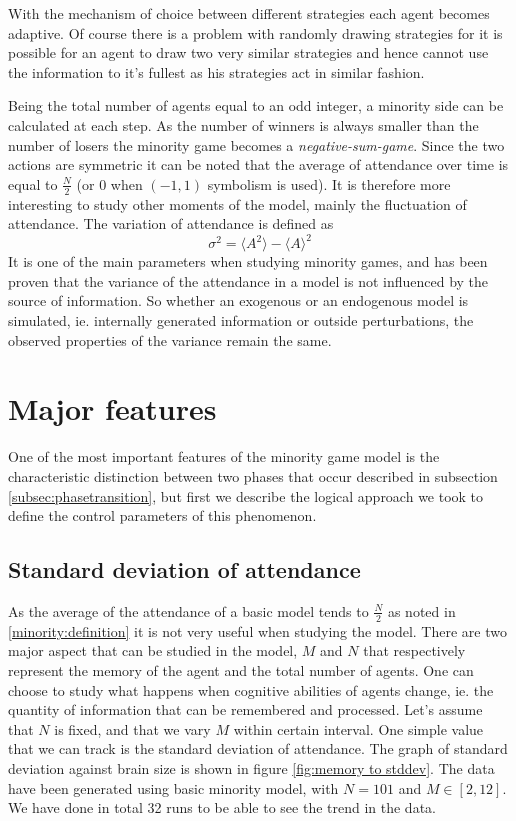 With the mechanism of choice between different strategies each agent becomes adaptive.
Of course there is a problem with randomly drawing strategies for it is possible for an agent to draw two very similar strategies and hence cannot use the information to it's fullest as his strategies act in similar fashion.

Being the total number of agents equal to an odd integer, a minority side can be calculated at each step.
As the number of winners is always smaller than the number of losers the minority game becomes a \textit{negative-sum-game}.
Since the two actions are symmetric it can be noted that the average of attendance over time is equal to $\frac{N}{2}$ (or $0$ when $(-1,1)$ symbolism is used).
It is therefore more interesting to study other moments of the model, mainly the fluctuation of attendance.
The variation of attendance is defined as
\begin{displaymath}
\sigma^2 = \langle A^2 \rangle - \langle A \rangle^2
\end{displaymath}
It is one of the main parameters when studying minority games, and has been proven that the variance of the attendance in a model is not influenced by the source of information.
So whether an exogenous or an endogenous model is simulated, ie. internally generated information or outside perturbations, the observed properties of the variance remain the same.

\section{Major features}
\label{miinority:majorfeatures}
One of the most important features of the minority game model  is the characteristic distinction between two phases that occur described in subsection \ref{subsec:phasetransition}, but first we describe the logical approach we took to define the control parameters of this phenomenon.

\subsection{Standard deviation of attendance}
\label{subsec:stddev}

As the average of the attendance of a basic model tends to $\frac{N}{2}$ as noted in \ref{minority:definition} it is not very useful when studying the model.
There are two major aspect that can be studied in the model, $M$ and $N$ that respectively represent the memory of the agent and the total number of agents.
One can choose to study what happens when cognitive abilities of agents change, ie. the quantity of information that can be remembered and processed.
Let's assume that $N$ is fixed, and that we vary $M$ within certain interval.
One simple value that we can track is the standard deviation of attendance.
The graph of standard deviation against brain size is shown in figure \ref{fig:memory to stddev}.
The data have been generated using basic minority model, with $N=101$ and $M\in[2,12]$.
We have done in total 32 runs to be able to see the trend in the data.

